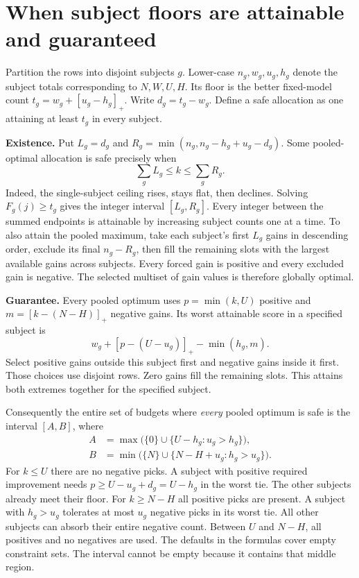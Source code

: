 \documentclass[11pt]{article}
\newcommand{\pos}[1]{[#1]_+}
\begin{document}
\newpage
\section{When subject floors are attainable and guaranteed}
Partition the rows into disjoint subjects $g$. Lower-case $n_g,w_g,u_g,h_g$ denote the subject totals corresponding to $N,W,U,H$. Its floor is the better fixed-model count $t_g=w_g+\pos{u_g-h_g}$. Write $d_g=t_g-w_g$. Define a safe allocation as one attaining at least $t_g$ in every subject.

\textbf{Existence.} Put $L_g=d_g$ and $R_g=\min(n_g,n_g-h_g+u_g-d_g)$. Some pooled-optimal allocation is safe precisely when
\[
                 \sum_g L_g \le k \le \sum_g R_g .
\]
Indeed, the single-subject ceiling rises, stays flat, then declines. Solving $F_g(j)\ge t_g$ gives the integer interval $[L_g,R_g]$. Every integer between the summed endpoints is attainable by increasing subject counts one at a time. To also attain the pooled maximum, take each subject's first $L_g$ gains in descending order, exclude its final $n_g-R_g$, then fill the remaining slots with the largest available gains across subjects. Every forced gain is positive and every excluded gain is negative. The selected multiset of gain values is therefore globally optimal.

\textbf{Guarantee.} Every pooled optimum uses $p=\min(k,U)$ positive and $m=\pos{k-(N-H)}$ negative gains. Its worst attainable score in a specified subject is
\[
       w_g+\pos{p-(U-u_g)}-\min(h_g,m).
\]
Select positive gains outside this subject first and negative gains inside it first. Those choices use disjoint rows. Zero gains fill the remaining slots. This attains both extremes together for the specified subject.

Consequently the entire set of budgets where \emph{every} pooled optimum is safe is the interval $[A,B]$, where
\[
\begin{aligned}
 A&=\max\bigl(\{0\}\cup\{U-h_g:u_g>h_g\}\bigr),\\
 B&=\min\bigl(\{N\}\cup\{N-H+u_g:h_g>u_g\}\bigr).
\end{aligned}
\]
For $k\le U$ there are no negative picks. A subject with positive required improvement needs $p\ge U-u_g+d_g=U-h_g$ in the worst tie. The other subjects already meet their floor. For $k\ge N-H$ all positive picks are present. A subject with $h_g>u_g$ tolerates at most $u_g$ negative picks in its worst tie. All other subjects can absorb their entire negative count. Between $U$ and $N-H$, all positives and no negatives are used. The defaults in the formulas cover empty constraint sets. The interval cannot be empty because it contains that middle region.
\end{document}
